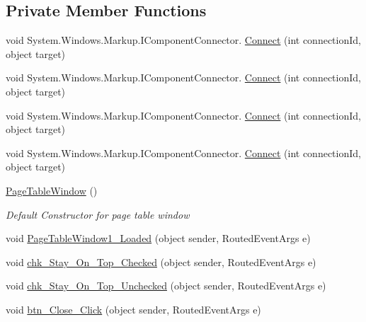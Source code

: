 \subsection*{Private Member Functions}
\begin{DoxyCompactItemize}
\item 
void System.\+Windows.\+Markup.\+I\+Component\+Connector. \hyperlink{class_c_p_u___o_s___simulator_1_1_page_table_window_a5843f37edba076f17d15fe9f9f20d930}{Connect} (int connection\+Id, object target)
\item 
void System.\+Windows.\+Markup.\+I\+Component\+Connector. \hyperlink{class_c_p_u___o_s___simulator_1_1_page_table_window_a5843f37edba076f17d15fe9f9f20d930}{Connect} (int connection\+Id, object target)
\item 
void System.\+Windows.\+Markup.\+I\+Component\+Connector. \hyperlink{class_c_p_u___o_s___simulator_1_1_page_table_window_a5843f37edba076f17d15fe9f9f20d930}{Connect} (int connection\+Id, object target)
\item 
void System.\+Windows.\+Markup.\+I\+Component\+Connector. \hyperlink{class_c_p_u___o_s___simulator_1_1_page_table_window_a5843f37edba076f17d15fe9f9f20d930}{Connect} (int connection\+Id, object target)
\item 
\hyperlink{class_c_p_u___o_s___simulator_1_1_page_table_window_a9ddde0b8d78abd882007a4d919e5a082}{Page\+Table\+Window} ()
\begin{DoxyCompactList}\small\item\em Default Constructor for page table window \end{DoxyCompactList}\item 
void \hyperlink{class_c_p_u___o_s___simulator_1_1_page_table_window_a32fcbb5d7acdefedbf7b81194f046f40}{Page\+Table\+Window1\+\_\+\+Loaded} (object sender, Routed\+Event\+Args e)
\item 
void \hyperlink{class_c_p_u___o_s___simulator_1_1_page_table_window_a4fca878351d58351729a016149ab037e}{chk\+\_\+\+Stay\+\_\+\+On\+\_\+\+Top\+\_\+\+Checked} (object sender, Routed\+Event\+Args e)
\item 
void \hyperlink{class_c_p_u___o_s___simulator_1_1_page_table_window_a7d678a6670baff37546ea625ae36a63c}{chk\+\_\+\+Stay\+\_\+\+On\+\_\+\+Top\+\_\+\+Unchecked} (object sender, Routed\+Event\+Args e)
\item 
void \hyperlink{class_c_p_u___o_s___simulator_1_1_page_table_window_ae072e4c12e228104c4e3b201c1c9d812}{btn\+\_\+\+Close\+\_\+\+Click} (object sender, Routed\+Event\+Args e)
\item 

\end{DoxyCompactItemize}
